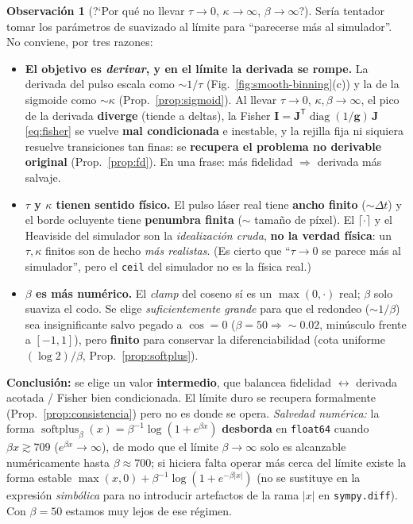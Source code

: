 \documentclass[11pt,a4paper]{article}
\theoremstyle{plain}
\theoremstyle{definition}
\newtheorem{remark}{Observaci\'on}
\newcommand{\vect}[1]{\boldsymbol{#1}}
\newcommand{\matr}[1]{\mathbf{#1}}
\newcommand{\softplus}{\operatorname{softplus}}
\DeclareMathOperator{\diag}{diag}
\begin{document}
\begin{remark}[\textup{?`}Por qu\'e no llevar $\tau\to0$, $\kappa\to\infty$, $\beta\to\infty$?]
\label{rem:trade-off}
Ser\'ia tentador tomar los par\'ametros de suavizado al l\'imite para ``parecerse
m\'as al simulador''. No conviene, por tres razones:
\begin{itemize}[nosep]
    \item \textbf{El objetivo es \emph{derivar}, y en el l\'imite la derivada se
    rompe.} La derivada del pulso escala como $\sim1/\tau$
    (Fig.~\ref{fig:smooth-binning}(c)) y la de la sigmoide como $\sim\kappa$
    (Prop.~\ref{prop:sigmoid}). Al llevar $\tau\to0$, $\kappa,\beta\to\infty$, el
    pico de la derivada \textbf{diverge} (tiende a deltas), la Fisher
    $\matr I=\matr J^{\mathsf T}\diag(1/\vect g)\,\matr J$ \eqref{eq:fisher} se
    vuelve \textbf{mal condicionada} e inestable, y la rejilla fija ni siquiera
    resuelve transiciones tan finas: se \textbf{recupera el problema no derivable
    original} (Prop.~\ref{prop:fd}). En una frase: m\'as fidelidad $\Rightarrow$
    derivada m\'as salvaje.
    \item \textbf{$\tau$ y $\kappa$ tienen sentido f\'isico.} El pulso l\'aser real
    tiene \textbf{ancho finito} ($\sim\Delta t$) y el borde ocluyente tiene
    \textbf{penumbra finita} ($\sim$ tama\~no de p\'ixel). El $\lceil\cdot\rceil$ y
    el Heaviside del simulador son la \emph{idealizaci\'on cruda}, \textbf{no la
    verdad f\'isica}: un $\tau,\kappa$ finitos son de hecho \emph{m\'as realistas}.
    (Es cierto que ``$\tau\to0$ se parece m\'as al simulador'', pero el
    \texttt{ceil} del simulador no es la f\'isica real.)
    \item \textbf{$\beta$ es m\'as num\'erico.} El \emph{clamp} del coseno s\'i es un
    $\max(0,\cdot)$ real; $\beta$ solo suaviza el codo. Se elige
    \emph{suficientemente grande} para que el redondeo ($\sim1/\beta$) sea
    insignificante salvo pegado a $\cos=0$ ($\beta=50\Rightarrow\sim0.02$,
    min\'usculo frente a $[-1,1]$), pero \textbf{finito} para conservar la
    diferenciabilidad (cota uniforme $(\log2)/\beta$, Prop.~\ref{prop:softplus}).
\end{itemize}
\textbf{Conclusi\'on:} se elige un valor \textbf{intermedio}, que balancea
fidelidad $\leftrightarrow$ derivada acotada / Fisher bien condicionada. El
l\'imite duro se recupera formalmente (Prop.~\ref{prop:consistencia}) pero no es
donde se opera. \emph{Salvedad num\'erica:} la forma
$\softplus_\beta(x)=\beta^{-1}\log(1+e^{\beta x})$ \textbf{desborda} en
\texttt{float64} cuando $\beta x\gtrsim709$ ($e^{\beta x}\to\infty$), de modo que
el l\'imite $\beta\to\infty$ solo es alcanzable num\'ericamente hasta
$\beta\approx700$; si hiciera falta operar m\'as cerca del l\'imite existe la
forma estable $\max(x,0)+\beta^{-1}\log(1+e^{-\beta|x|})$ (no se sustituye en la
expresi\'on \emph{simb\'olica} para no introducir artefactos de la rama $|x|$ en
\texttt{sympy.diff}). Con $\beta=50$ estamos muy lejos de ese r\'egimen.
\end{remark}
\end{document}
